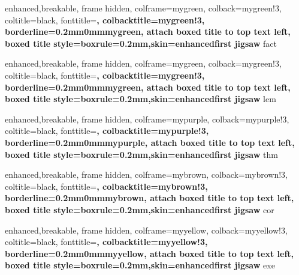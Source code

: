 {
	enhanced,breakable,
	frame hidden,
	colframe=mygreen,
	colback=mygreen!3,
	coltitle=black,
	fonttitle=\bfseries,
	colbacktitle=mygreen!3,
	borderline={0.2mm}{0mm}{mygreen},
	attach boxed title to top text left,
	boxed title style={boxrule=0.2mm,skin=enhancedfirst jigsaw}
}
{fact}

{
	enhanced,breakable,
	frame hidden,
	colframe=mygreen,
	colback=mygreen!3,
	coltitle=black,
	fonttitle=\bfseries,
	colbacktitle=mygreen!3,
	borderline={0.2mm}{0mm}{mygreen},
	attach boxed title to top text left,
	boxed title style={boxrule=0.2mm,skin=enhancedfirst jigsaw}
}
{lem}

{
	enhanced,breakable,
	frame hidden,
	colframe=mypurple,
	colback=mypurple!3,
	coltitle=black,
	fonttitle=\bfseries,
	colbacktitle=mypurple!3,
	borderline={0.2mm}{0mm}{mypurple},
	attach boxed title to top text left,
	boxed title style={boxrule=0.2mm,skin=enhancedfirst jigsaw}
}
{thm}

{
	enhanced,breakable,
	frame hidden,
	colframe=mybrown,
	colback=mybrown!3,
	coltitle=black,
	fonttitle=\bfseries,
	colbacktitle=mybrown!3,
	borderline={0.2mm}{0mm}{mybrown},
	attach boxed title to top text left,
	boxed title style={boxrule=0.2mm,skin=enhancedfirst jigsaw}
}
{cor}

{
	enhanced,breakable,
	frame hidden,
	colframe=myyellow,
	colback=myyellow!3,
	coltitle=black,
	fonttitle=\bfseries,
	colbacktitle=myyellow!3,
	borderline={0.2mm}{0mm}{myyellow},
	attach boxed title to top text left,
	boxed title style={boxrule=0.2mm,skin=enhancedfirst jigsaw}
}
{exe}

\newenvironment{proofidea}{\renewcommand{\proofname}{Proof Idea}\proof}{\endproof}


\def\R{\mathbb R}
\def\Cb{\mathbb C}
\def\N{\mathbb N}
\def\Z{\mathbb Z}
\def\Q{\mathbb Q}
\def\E{\mathbb E}

\def\mor{\mathrm {Mor}}
\def\ob{\mathrm {Ob}}

\def\P{\mathfrak{P}}

\def\M{\mathcal{M}}
\def\C{\mathcal{C}}
\def\H{\mathcal{H}}
\def\A{\mathcal{A}}
\def\B{\mathcal{B}}

\def\gen{{\mathcal{M}_\mathrm{gen}}}
\def\inj{{\mathcal{M}_\mathrm{inj}}}
\def\iso{{\mathcal{M}_\mathrm{iso}}}

